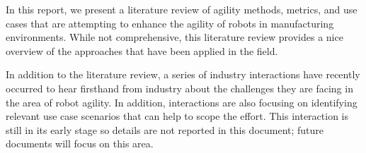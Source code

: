 \label{chapter:CONCLUSION}
In this report, we present a literature review of agility methods, metrics, and use cases that are attempting to enhance the agility of robots in manufacturing environments.  While not comprehensive, this literature review provides a nice overview of the approaches that have been applied in the field.

In addition to the literature review, a series of industry interactions have recently occurred to hear firsthand from industry about the challenges they are facing in the area of robot agility. In addition, interactions are also focusing on identifying relevant use case scenarios that can help to scope the effort. This interaction is still in its early stage so details are not reported in this document; future documents will focus on this area. 